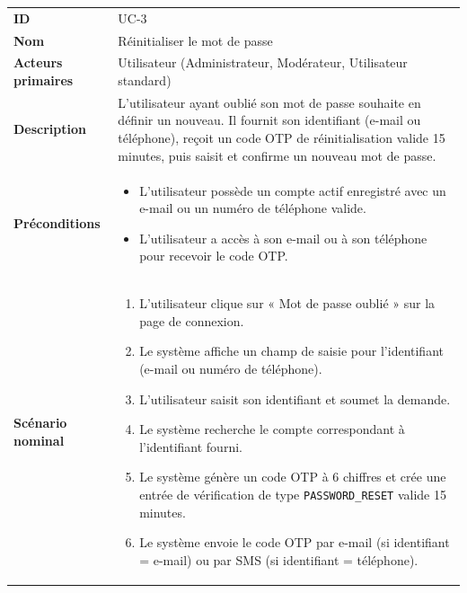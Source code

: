 \documentclass[12pt,a4paper]{report}
\begin{document}
\begin{center}
\renewcommand{\arraystretch}{1.5}
\begin{longtable}{|L{4cm}|L{11.5cm}|}
\hline
{}
 \\
\hline
\textbf{ID}               & UC-3 \\
\hline
\textbf{Nom}              & Réinitialiser le mot de passe \\
\hline
\textbf{Acteurs primaires} & Utilisateur (Administrateur, Modérateur, Utilisateur standard) \\
\hline
\textbf{Description}      & L'utilisateur ayant oublié son mot de passe souhaite en définir un nouveau. Il fournit son identifiant (e-mail ou téléphone), reçoit un code OTP de réinitialisation valide 15 minutes, puis saisit et confirme un nouveau mot de passe. \\
\hline
\textbf{Préconditions}    &
\begin{itemize}
  \item L'utilisateur possède un compte actif enregistré avec un e-mail ou un numéro de téléphone valide.
  \item L'utilisateur a accès à son e-mail ou à son téléphone pour recevoir le code OTP.
\end{itemize} \\
\hline
\textbf{Scénario nominal} &
\begin{enumerate}
  \item L'utilisateur clique sur « Mot de passe oublié » sur la page de connexion.
  \item Le système affiche un champ de saisie pour l'identifiant (e-mail ou numéro de téléphone).
  \item L'utilisateur saisit son identifiant et soumet la demande.
  \item Le système recherche le compte correspondant à l'identifiant fourni.
  \item Le système génère un code OTP à 6 chiffres et crée une entrée de vérification de type \texttt{PASSWORD\_RESET} valide 15 minutes.
  \item Le système envoie le code OTP par e-mail (si identifiant = e-mail) ou par SMS (si identifiant = téléphone).

\end{enumerate}
\end{longtable}
\end{center}
\end{document}

